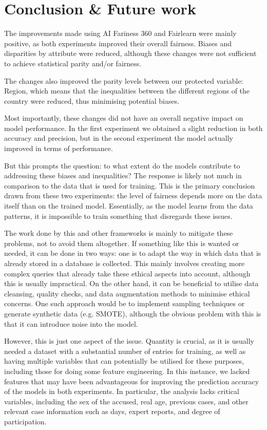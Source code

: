 \documentclass[twoside,11pt]{article}
\begin{document}
\section{Conclusion \& Future work}
\label{conclusion}

The improvements made using AI Fariness 360 and Fairlearn were mainly positive, as both experiments improved their overall fairness. Biases and disparities by attribute were reduced, although these changes were not sufficient to achieve statistical parity and/or fairness.

The changes also improved the parity levels between our protected variable: Region, which means that the inequalities between the different regions of the country were reduced, thus minimising potential biases. 

Most importantly, these changes did not have an overall negative impact on model performance. In the first experiment we obtained a slight reduction in both accuracy and precision, but in the second experiment the model actually improved in terms of performance.

But this prompts the question: to what extent do the models contribute to addressing these biases and inequalities? The response is likely not much in comparison to the data that is used for training. This is the primary conclusion drawn from these two experiments: the level of fairness depends more on the data itself than on the trained model. Essentially, as the model learns from the data patterns, it is impossible to train something that disregards these issues.

The work done by this and other frameworks is mainly to mitigate these problems, not to avoid them altogether. If something like this is wanted or needed, it can be done in two ways: one is to adapt the way in which data that is already stored in a database is collected. This mainly involves creating more complex queries that already take these ethical aspects into account, although this is usually impractical. On the other hand, it can be beneficial to utilise data cleansing, quality checks, and data augmentation methods to minimise ethical concerns. One such approach would be to implement sampling techniques or generate synthetic data (e.g. SMOTE), although the obvious problem with this is that it can introduce noise into the model.

However, this is just one aspect of the issue. Quantity is crucial, as it is usually needed a dataset with a substantial number of entries for training, as well as having multiple variables that can potentially be utilised for these purposes, including those for doing some feature engineering. In this instance, we lacked features that may have been advantageous for improving the prediction accuracy of the models in both experiments. In particular, the analysis lacks critical variables, including the sex of the accused, real age, previous cases, and other relevant case information such as days, expert reports, and degree of participation.
\end{document}
